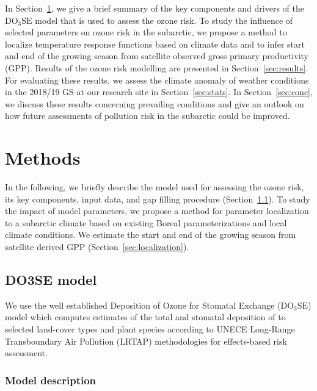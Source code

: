 \documentclass[bg, manuscript]{copernicus}
\begin{document}
In Section~\ref{sec:dam}, we give a brief summary of the key components and  drivers of the $\mathrm{DO_3SE}$ model that is used to assess the ozone risk. To study the influence of selected parameters on ozone risk in the subarctic, we propose a method to localize temperature response functions based on climate data and to infer start and end of the growing season from satellite observed gross primary productivity (GPP). Results of the ozone risk modelling are presented in Section~\ref{sec:results}. For evaluating these results, we assess the climate anomaly of weather conditions in the 2018/19 GS at our research site in Section~\ref{sec:stats}. In Section~\ref{sec:conc}, we discuss these results concerning prevailing conditions and give an outlook on how future assessments of pollution risk in the subarctic could be improved.

\section{Methods}
\label{sec:dam}
In the following, we briefly describe the model used for assessing the ozone risk, its key components, input data, and gap filling procedure (Section~\ref{sec:do3se}). To study the impact of model parameters, we propose a method for parameter localization to a subarctic climate based on existing Boreal parameterizations and local climate conditions. We estimate the start and end of the growing season from satellite derived GPP (Section~\ref{sec:localization}).

\subsection{DO3SE model}
\label{sec:do3se}
We use the well established Deposition of Ozone for Stomatal Exchange ($\mathrm{DO_3SE}$) model \citep{ACP:Bueker2012} which computes estimates of the total and stomatal deposition of  to selected land-cover types and plant species according to UNECE Long-Range Transboundary Air Pollution (LRTAP) methodologies for effects-based risk assessment.

\subsubsection{Model description}
\label{subsec:model_describtion}
\end{document}
